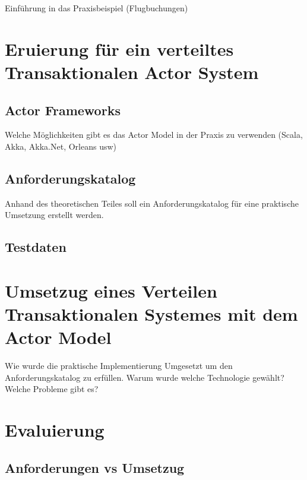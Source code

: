 Einführung in das Praxisbeispiel (Flugbuchungen)
\chapter{Eruierung für ein verteiltes Transaktionalen Actor System }
\section{Actor Frameworks}\label{sec:ActorFrameworks}
Welche Möglichkeiten gibt es das Actor Model in der Praxis zu verwenden (Scala, Akka, Akka.Net, Orleans usw)

\section{Anforderungskatalog}
Anhand des theoretischen Teiles soll ein Anforderungskatalog für eine praktische Umsetzung erstellt werden.

\section{Testdaten}

\chapter{Umsetzug eines Verteilen Transaktionalen Systemes mit dem Actor Model}
Wie wurde die praktische Implementierung Umgesetzt um den Anforderungskatalog zu erfüllen. Warum wurde welche Technologie gewählt? Welche Probleme gibt es? 

\chapter{Evaluierung}
\section{Anforderungen vs Umsetzug}

